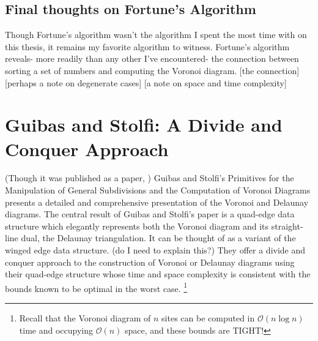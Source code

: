 \documentclass[12pt,twoside]{reedthesis}
\makeatletter
\let\OldStatex\Statex
\renewcommand{\Statex}[1][3]{%
  \setlength\@tempdima{\algorithmicindent}%
  \OldStatex\hskip\dimexpr#1\@tempdima\relax}
\makeatother
\begin{document}
  \begin{algorithm}[H]
  \end{algorithm}

  \begin{algorithm}[H]
  \end{algorithm}

  \subsection{Final thoughts on Fortune's Algorithm} %
  \label{sub:final_thoughts_on_fortune_s_algorithm}
  Though Fortune's algorithm wasn't the algorithm I spent the most time with on this thesis, it remains my favorite algorithm to witness. Fortune's algorithm reveals- more readily than any other I've encountered- the connection between sorting a set of numbers and computing the Voronoi diagram. [the connection]
  [perhaps a note on degenerate cases]
  [a note on space and time complexity] 

  \section{Guibas and Stolfi: A Divide and Conquer Approach} %
  \label{sec:divide_and_conquer}
  (Though it was published as a paper, ) Guibas and Stolfi's Primitives for the Manipulation of General Subdivisions and the Computation of Voronoi Diagrams presents a detailed and comprehensive presentation of the Voronoi and Delaunay diagrams. The central result of Guibas and Stolfi's paper is a quad-edge data structure which elegantly represents both the Voronoi diagram and its straight-line dual, the Delaunay triangulation. It can be thought of as a variant of the winged edge data structure. (do I need to explain this?) They offer a divide and conquer approach to the construction of Voronoi or Delaunay diagrams using their quad-edge structure whose time and space complexity is consistent with the bounds known to be optimal in the worst case. \footnote{Recall that the Voronoi diagram of $n$ sites can be computed in $\mathcal{O}(n\log n)$ time and occupying $\mathcal{O}(n)$ space, and these bounds are TIGHT!}
\end{document}
